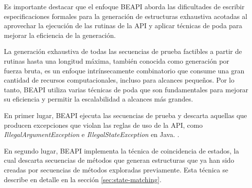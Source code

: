 


Es importante destacar que el enfoque \textsf{BEAPI} aborda las dificultades de escribir especificaciones formales para la generación de estructuras exhaustiva acotadas al aprovechar la ejecución de las rutinas de la API y aplicar técnicas de poda para mejorar la eficiencia de la generación.

La generación exhaustiva de todas las secuencias de prueba factibles a partir de rutinas hasta una longitud máxima, también conocida como generación por fuerza bruta, es un enfoque intrínsecamente combinatorio que consume una gran cantidad de recursos computacionales, incluso para alcances pequeños. Por lo tanto, \textsf{BEAPI} utiliza varias técnicas de poda que son fundamentales para mejorar su eficiencia y permitir la escalabilidad a alcances más grandes.

En primer lugar, \textsf{BEAPI} ejecuta las secuencias de prueba y descarta
aquellas que producen excepciones que violan las reglas de uso de la API, como
\emph{IllegalArgumentException} e \emph{IllegalStateException} en Java.
.

En segundo lugar, \textsf{BEAPI} implementa la técnica de coincidencia de estados, la cual descarta secuencias de métodos que generan estructuras que ya han sido creadas por secuencias de métodos exploradas previamente. Esta técnica se describe en detalle en la sección \ref{sec:state-matching}.

